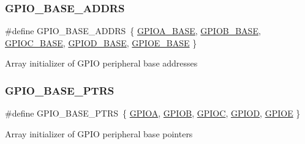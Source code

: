 \subsubsection{\texorpdfstring{GPIO\_BASE\_ADDRS}{GPIO\_BASE\_ADDRS}}
{\footnotesize\ttfamily \#define G\+P\+I\+O\+\_\+\+B\+A\+S\+E\+\_\+\+A\+D\+D\+RS~\{ \mbox{\hyperlink{group___g_p_i_o___peripheral___access___layer_gad7723846cc5db8e43a44d78cf21f6efa}{G\+P\+I\+O\+A\+\_\+\+B\+A\+SE}}, \mbox{\hyperlink{group___g_p_i_o___peripheral___access___layer_gac944a89eb789000ece920c0f89cb6a68}{G\+P\+I\+O\+B\+\_\+\+B\+A\+SE}}, \mbox{\hyperlink{group___g_p_i_o___peripheral___access___layer_ga26f267dc35338eef219544c51f1e6b3f}{G\+P\+I\+O\+C\+\_\+\+B\+A\+SE}}, \mbox{\hyperlink{group___g_p_i_o___peripheral___access___layer_ga1a93ab27129f04064089616910c296ec}{G\+P\+I\+O\+D\+\_\+\+B\+A\+SE}}, \mbox{\hyperlink{group___g_p_i_o___peripheral___access___layer_gab487b1983d936c4fee3e9e88b95aad9d}{G\+P\+I\+O\+E\+\_\+\+B\+A\+SE}} \}}

Array initializer of G\+P\+IO peripheral base addresses \mbox{\label{group___g_p_i_o___peripheral___access___layer_gad0f7206167a584b1e75a81a5c30fa1c2}} 
\subsubsection{\texorpdfstring{GPIO\_BASE\_PTRS}{GPIO\_BASE\_PTRS}}
{\footnotesize\ttfamily \#define G\+P\+I\+O\+\_\+\+B\+A\+S\+E\+\_\+\+P\+T\+RS~\{ \mbox{\hyperlink{group___g_p_i_o___peripheral___access___layer_gac485358099728ddae050db37924dd6b7}{G\+P\+I\+OA}}, \mbox{\hyperlink{group___g_p_i_o___peripheral___access___layer_ga68b66ac73be4c836db878a42e1fea3cd}{G\+P\+I\+OB}}, \mbox{\hyperlink{group___g_p_i_o___peripheral___access___layer_ga2dca03332d620196ba943bc2346eaa08}{G\+P\+I\+OC}}, \mbox{\hyperlink{group___g_p_i_o___peripheral___access___layer_ga7580b1a929ea9df59725ba9c18eba6ac}{G\+P\+I\+OD}}, \mbox{\hyperlink{group___g_p_i_o___peripheral___access___layer_gae04bdb5e8acc47cab1d0532e6b0d0763}{G\+P\+I\+OE}} \}}

Array initializer of G\+P\+IO peripheral base pointers \mbox{\label{group___g_p_i_o___peripheral___access___layer_gac485358099728ddae050db37924dd6b7}} 
